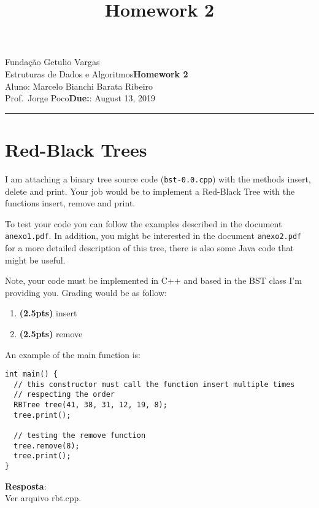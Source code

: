 \documentclass{article}
\title{Homework 2}
\date{}
\newcommand{\assignment}{Homework 2}
\newcommand{\duedate}{August 13, 2019}
\begin{document}
Fundação Getulio Vargas\hfill\\
Estruturas de Dados e Algoritmos\hfill\textbf{\assignment}\\
Aluno: Marcelo Bianchi Barata Ribeiro\\
Prof.\ Jorge Poco\hfill\textbf{Due:}: \duedate\\
\smallskip\hrule\bigskip

{\let\newpage\relax\maketitle}
\maketitle


\section{Red-Black Trees}

I am attaching a binary tree source code (\texttt{bst-0.0.cpp}) with the methods insert, delete and print. Your job would be to implement a Red-Black Tree with the functions insert, remove and print. 

To test your code you can follow the examples described in the document \texttt{anexo1.pdf}. In addition, you might be interested in the document \texttt{anexo2.pdf} for a more detailed description of this tree, there is also some Java code that might be useful. 

Note, your code must be implemented in C++ and based in the BST class I'm providing you. Grading would be as follow:

\begin{enumerate}[label=(\alph*)]
  \item \textbf{(2.5pts)} insert 
  \item \textbf{(2.5pts)} remove 
\end{enumerate}

An example of the main function is: 

\begin{lstlisting}
int main() {
  // this constructor must call the function insert multiple times 
  // respecting the order
  RBTree tree(41, 38, 31, 12, 19, 8);
  tree.print();

  // testing the remove function
  tree.remove(8);
  tree.print();
}
\end{lstlisting}

\textbf{Resposta}:\\
Ver arquivo rbt.cpp.
\end{document}
